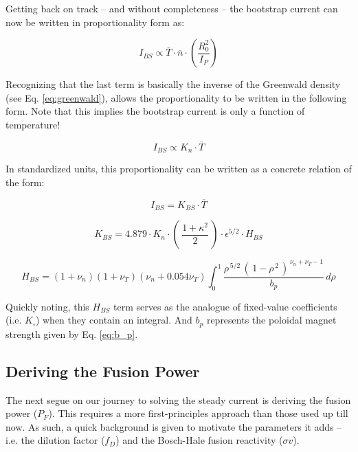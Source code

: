 \documentclass[11pt]{book}
\begin{document}
Getting back on track -- and without completeness -- the bootstrap current can now be written in proportionality form as:

\begin{equation}
	I_{BS} \propto \overline T \cdot \overline n \cdot \left( \frac{R_0^2}{I_P} \right)
\end{equation}

Recognizing that the last term is basically the inverse of the Greenwald density (see Eq. \ref{eq:greenwald}), allows the proportionality to be written in the following form. Note that this implies the bootstrap current is only a function of temperature!

\begin{equation}
	I_{BS} \propto K_n \cdot \overline T
\end{equation}

In standardized units, this proportionality can be written as a concrete relation of the form:

\begin{equation}
	\label{eq:ibs}
	I_{BS} = K_{BS} \cdot \overline T
\end{equation}

\begin{equation}
  K_{BS} = 4.879 \cdot  K_n \cdot \left( \, \frac{1+\kappa^2}{2} \, \right) \cdot \epsilon^{5/2} \cdot H_{BS}
\end{equation}

\begin{equation}
  H_{BS} = ( 1 + \nu_n ) ( 1 + \nu_T ) ( \nu_n + 0.054 \nu_T ) \int_0^1 \frac{ \rho^{\,5/2} \, ( \, 1 - \rho^{\,2} \, )^{\, \nu_n + \nu_T - 1} }{b_p} \, d\rho
\end{equation}

Quickly noting, this $H_{BS}$ term serves as the analogue of fixed-value coefficients (i.e. $K_\square$) when they contain an integral. And $b_p$ represents the poloidal magnet strength given by Eq. \ref{eq:b_p}.

\subsection{Deriving the Fusion Power}

The next segue on our journey to solving the steady current is deriving the fusion power ($P_F$). This requires a more first-principles approach than those used up till now. As such, a quick background is given to motivate the parameters it adds -- i.e. the dilution factor ($f_{D}$) and the Bosch-Hale fusion reactivity ($\sigma v$).
\end{document}
